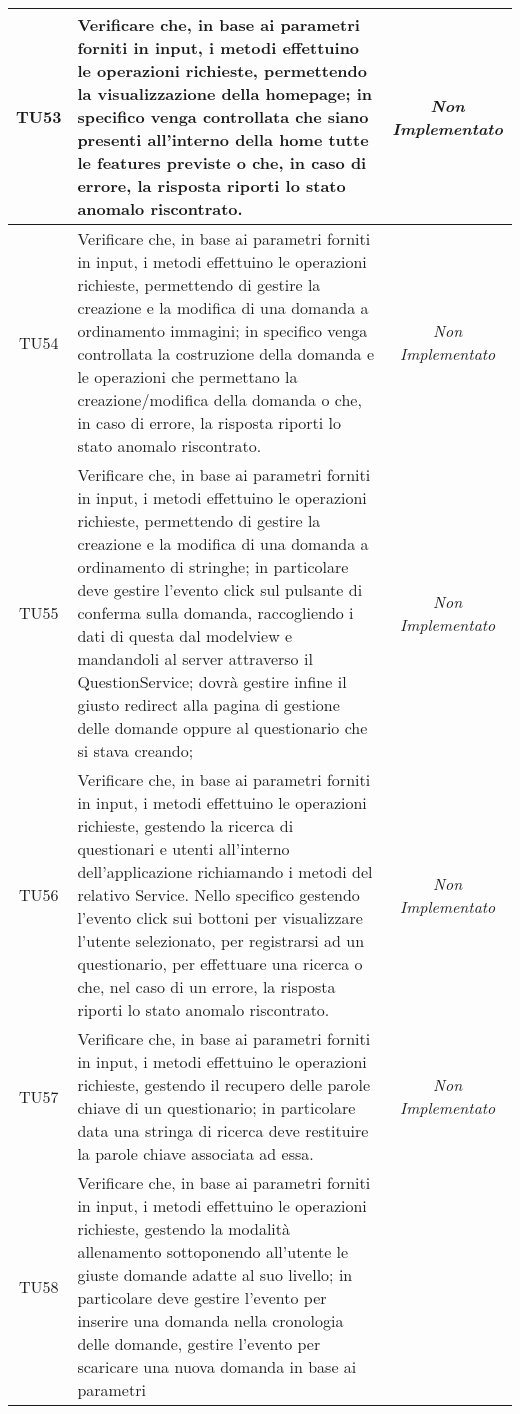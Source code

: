 \begin{longtable}{|c|>{}m{10cm}|c|}
\hypertarget{TU53}{TU53} & Verificare che, in base ai parametri forniti in input, i metodi effettuino le operazioni richieste, permettendo la visualizzazione della homepage; in specifico venga controllata che siano presenti all'interno della home tutte le features previste o che, in caso di errore, la risposta riporti lo stato anomalo riscontrato. & \textit{Non Implementato}\\ \hline
\hypertarget{TU54}{TU54} & Verificare che, in base ai parametri forniti in input, i metodi effettuino le operazioni richieste, permettendo di gestire la creazione e la modifica di una domanda a ordinamento immagini; in specifico venga controllata la costruzione della domanda e le operazioni che permettano la creazione/modifica della domanda o che, in caso di errore, la risposta riporti lo stato anomalo riscontrato. & \textit{Non Implementato}\\ \hline
\hypertarget{TU55}{TU55} & Verificare che, in base ai parametri forniti in input, i metodi effettuino le operazioni richieste, permettendo di gestire la creazione e la modifica di una domanda a ordinamento di stringhe; in particolare deve gestire l'evento click sul pulsante di conferma sulla domanda, raccogliendo i dati di questa dal modelview e mandandoli al server attraverso il QuestionService; dovrà gestire infine il giusto redirect alla pagina di gestione delle domande oppure al questionario che si stava creando; & \textit{Non Implementato}\\ \hline
\hypertarget{TU56}{TU56} & Verificare che, in base ai parametri forniti in input, i metodi effettuino le operazioni richieste, gestendo la ricerca di questionari e utenti all'interno dell'applicazione richiamando i metodi del relativo Service. Nello specifico gestendo l'evento click sui bottoni per visualizzare l'utente selezionato, per registrarsi ad un questionario, per effettuare una ricerca  o che, nel caso di un errore, la risposta riporti lo stato anomalo riscontrato. & \textit{Non Implementato}\\ \hline
\hypertarget{TU57}{TU57} & Verificare che, in base ai parametri forniti in input, i metodi effettuino le operazioni richieste, gestendo il recupero delle parole chiave di un questionario; in particolare data una stringa di ricerca deve restituire la parole chiave associata ad essa. & \textit{Non Implementato}\\ \hline
\hypertarget{TU58}{TU58} & Verificare che, in base ai parametri forniti in input, i metodi effettuino le operazioni richieste,  gestendo la modalità allenamento sottoponendo all'utente le giuste domande adatte al suo livello; in particolare deve gestire l'evento per inserire una domanda nella cronologia delle domande, gestire l'evento per scaricare una nuova domanda in base ai parametri

\end{longtable}
